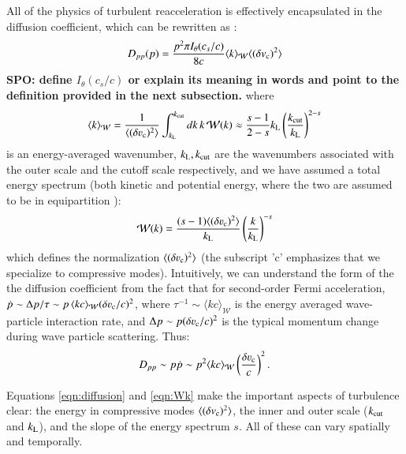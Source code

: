 \documentclass[fleqn,usenatbib,useAMS]{mnras}
\def\SPO#1{{\bf {\color{red} SPO: #1}}}
\begin{document}
All of the physics of turbulent reacceleration is effectively encapsulated in the diffusion coefficient, which can be rewritten as \citep{miniati15}:
\begin{equation}
D_{pp}(p) = \frac{ p^{2} \pi I_{\theta}(c_{s}/c)}{8 c} \langle k \rangle_{\mathcal{W}} \langle (\delta v_{\rm c})^{2} \rangle
\label{eqn:diffusion}
\end{equation}
\SPO{define $I_{\theta}(c_{s}/c)$ or explain its meaning in words and point to the definition provided in the next subsection.}
where
\begin{equation}
\langle k \rangle_{\mathcal{W}} = \frac{1}{\langle (\delta \varv_{\rm c})^{2} \rangle} \int_{k_{\rm L}}^{k_{\rm cut}} dk \, k \, \mathcal{W}(k) \approx \frac{s-1}{2-s} k_{\rm L} \left( \frac{k_{\rm cut}}{k_{\rm L}} \right)^{2-s} 
\label{eqn:k_W} 
\end{equation}
is an energy-averaged wavenumber, $k_{\rm L}, k_{\rm cut}$ are the wavenumbers associated with the outer scale and the cutoff scale respectively, and we have assumed a total energy spectrum (both kinetic and potential energy, where the two are assumed to be in equipartition \citep{sarkar11}): 
\begin{equation}
\mathcal{W}(k) = \frac{(s-1) \langle (\delta \varv_{\rm c})^{2} \rangle}{k_{\rm L}} \left( \frac{k}{k_{\rm L}} \right)^{-s} 
\label{eqn:Wk}
\end{equation}
which defines the normalization $\langle (\delta \varv_{\rm c})^{2} \rangle$ (the subscript 'c' emphasizes that we specialize to compressive modes). Intuitively, we can understand the form of the the diffusion coefficient from the fact that for second-order Fermi acceleration, $\dot{p} \sim \Delta p/\tau \sim p\,\langle k c \rangle_{\mathcal{W}} (\delta \varv_{\rm c}/c)^{2}$, where $\tau^{-1} \sim \langle k c \rangle_{\mathcal{W}}$ is the energy averaged wave-particle interaction rate, and $\Delta p \sim p (\delta \varv_{\rm c}/c)^{2}$ is the typical momentum change during wave particle scattering. Thus: 
\begin{equation}
D_{pp} \sim p \dot{p} \sim p^{2} \langle k c \rangle_{\mathcal{W}} \left( \frac{\delta \varv_{\rm c}}{c} \right)^{2}. 
\end{equation}

Equations \ref{eqn:diffusion} and \ref{eqn:Wk} make the important aspects of turbulence clear: the energy in compressive modes $\langle (\delta v_{\rm c})^{2} \rangle$, the inner and outer scale ($k_{\rm cut}$ and $k_{\rm L}$), and the slope of the energy spectrum $s$. All of these can vary spatially and temporally. 
\end{document}
